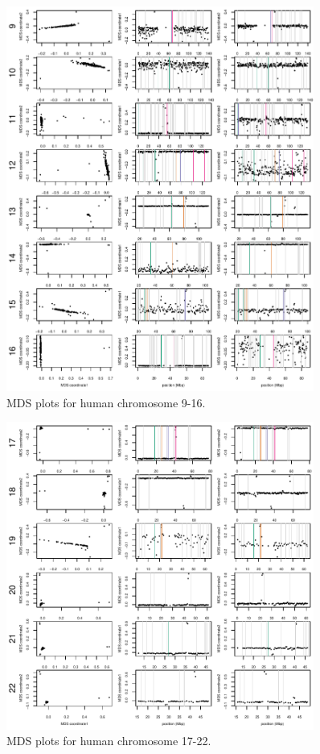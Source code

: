 \documentclass[11pt, oneside]{article}   	%
\begin{document}
\begin{figure}
    \begin{center}
       \includegraphics[width=0.9\textwidth]{FigS_human_MDS12_chr9_16_all_valid_and_pre}
    \end{center}
    \caption{
        MDS plots for human chromosome 9-16.
        \label{fig:mds12_chr9_16_human}
    }
\end{figure}

\begin{figure}
    \begin{center}
       \includegraphics[width=0.9\textwidth]{FigS_human_MDS12_chr17_22_all_valid_and_pre}
    \end{center}
    \caption{
        MDS plots for human chromosome 17-22.
        \label{fig:mds12_chr17_22_human}
    }
\end{figure}
\end{document}
